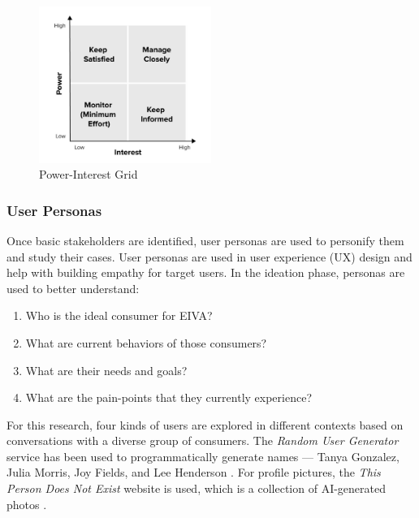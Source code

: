 \documentclass{article}
\begin{document}
\begin{figure}[h!]
	\centering
	\includegraphics[width=0.5\textwidth]{power-interest.jpg}
	\caption{Power-Interest Grid}
	\label{fig:checkbox}
\end{figure}

\subsubsection{User Personas}

Once basic stakeholders are identified, user personas are used to personify them and study their cases. User personas are used in user experience (UX) design and help with building empathy for target users. In the ideation phase, personas are used to better understand:

\begin{enumerate}
	\item Who is the ideal consumer for EIVA?
	\item What are current behaviors of those consumers?
	\item What are their needs and goals?
	\item What are the pain-points that they currently experience?
\end{enumerate}

For this research, four kinds of users are explored in different contexts based on conversations with a diverse group of consumers. The \emph{Random User Generator} service has been used to programmatically generate names --- Tanya Gonzalez, Julia Morris, Joy Fields, and Lee Henderson \cite{noauthor_random_nodate}. For profile pictures, the \emph{This Person Does Not Exist} website is used, which is a collection of AI-generated photos \cite{noauthor_this_nodate}.
\end{document}
